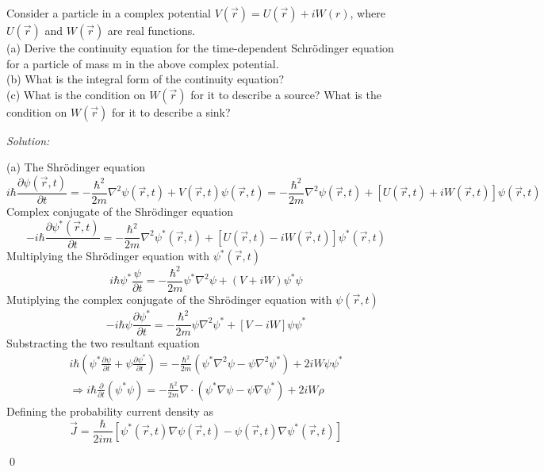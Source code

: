 \documentclass[12pt]{article}
\newenvironment{problem}[2][Problem]{\begin{trivlist}
\item[\hskip \labelsep {\bfseries #1}\hskip \labelsep {\bfseries #2.}]}{\end{trivlist}}
\newenvironment{sol}
    {\emph{Solution:}
    }
    {
    \qed
    }
\begin{document}
\begin{problem}{1}
Consider a particle in a complex potential $V(\vec{r})=U(\vec{r})+iW(r)$, where $U(\vec{r})$ and $W(\vec{r})$ are real functions.\\
(a) Derive the continuity equation for the time-dependent Schrödinger equation for a particle of mass m in the above complex potential.\\
(b) What is the integral form of the continuity equation?\\
(c) What is the condition on $W(\vec{r})$ for it to describe a source? What is the condition on $W(\vec{r})$ for it to describe a sink?
\end{problem}
\begin{sol}
(a) The Shrödinger equation
\begin{equation}
i\hbar\frac{\partial\psi(\vec{r},t)}{\partial t}=-\frac{\hbar^2}{2m}\nabla^2\psi(\vec{r},t)+V(\vec{r},t)\psi(\vec{r},t)=-\frac{\hbar^2}{2m}\nabla^2\psi(\vec{r},t)+[U(\vec{r},t)+iW(\vec{r},t)]\psi(\vec{r},t)
\end{equation}
Complex conjugate of the Shrödinger equation
\begin{equation}
-i\hbar\frac{\partial\psi^*(\vec{r},t)}{\partial t}=-\frac{\hbar^2}{2m}\nabla^2\psi^*(\vec{r},t)+[U(\vec{r},t)-iW(\vec{r},t)]\psi^*(\vec{r},t)
\end{equation}
Multiplying the Shrödinger equation with $\psi^*(\vec{r},t)$
\begin{equation}
i\hbar\psi^*\frac{\psi}{\partial t}=-\frac{\hbar^2}{2m}\psi^*\nabla^2\psi+(V+iW)\psi^*\psi
\end{equation}
Mutiplying the complex conjugate of the Shrödinger equation with $\psi(\vec{r},t)$
\begin{equation}
-i\hbar\psi\frac{\partial\psi^*}{\partial t}=-\frac{\hbar^2}{2m}\psi\nabla^2\psi^*+[V-iW]\psi\psi^*
\end{equation}
Substracting the two resultant equation
\begin{gather}
i\hbar(\psi^*\frac{\partial\psi}{\partial t}+\psi\frac{\partial\psi^*}{\partial t})=-\frac{\hbar^2}{2m}(\psi^*\nabla^2\psi-\psi\nabla^2\psi^*)+2iW\psi\psi^*\\
\Longrightarrow i\hbar\frac{\partial}{\partial t}(\psi^*\psi)=-\frac{\hbar^2}{2m}\nabla\cdot(\psi^*\nabla\psi-\psi\nabla\psi^*)+2iW\rho
\end{gather}
Defining the probability current density as
\begin{equation}
\vec{J}=\frac{\hbar}{2im}[\psi^*(\vec{r},t)\nabla\psi(\vec{r},t)-\psi(\vec{r},t)\nabla\psi^*(\vec{r},t)]

\end{equation}
\end{sol}
\end{document}
